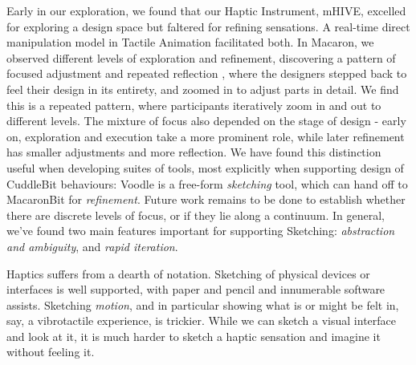 Early in our exploration, we found that our Haptic Instrument, mHIVE, excelled for exploring a design space but faltered for refining sensations.
A real-time direct manipulation model in Tactile Animation facilitated both.
In Macaron, we observed different levels of exploration and refinement, discovering a pattern of focused adjustment and repeated reflection \cite{Schon1982}, where the designers stepped back to feel their design in its entirety, and zoomed in to adjust parts in detail.
We find this is a repeated pattern, where participants iteratively zoom in and out to different levels.
The mixture of focus also depended on the stage of design - early on, exploration and execution take a more prominent role, while later refinement has smaller adjustments and more reflection.
We have found this distinction useful when developing suites of tools, most explicitly when supporting design of CuddleBit behaviours: 
Voodle is a free-form \emph{sketching} tool, which can hand off to MacaronBit for \emph{refinement}.
Future work remains to be done to establish whether there are discrete levels of focus, or if they lie along a continuum.
In general, we've found two main features important for supporting Sketching: \textit{abstraction and ambiguity}, and \textit{rapid iteration}.



%


	Haptics suffers from a dearth of notation.
	Sketching of physical devices or interfaces is well supported, with paper and pencil and innumerable software assists.
	Sketching \textit{motion}, and in particular showing what is or might be felt in, say, a vibrotactile experience, is  trickier.
	While we can sketch a visual interface and look at it, it is much harder to sketch a haptic sensation and imagine it without feeling it.

